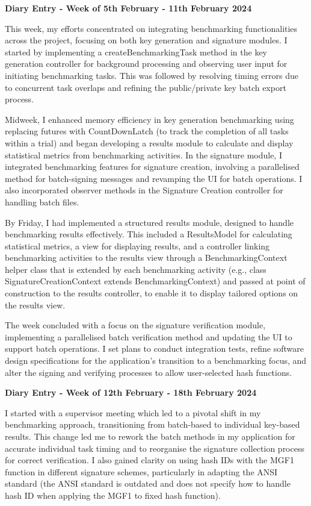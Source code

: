 \documentclass[]{final_report}
\theoremstyle{definition}
\begin{document}
\textbf{Diary Entry - Week of 5th February - 11th February 2024}

This week, my efforts concentrated on integrating benchmarking functionalities across the project,
focusing on both key generation and signature modules. I started by implementing a
createBenchmarkingTask method in the key generation controller for background processing and
observing user input for initiating benchmarking tasks. This was followed by resolving timing errors
due to concurrent task overlaps and refining the public/private key batch export process.

Midweek, I enhanced memory efficiency in key generation benchmarking using replacing futures with
CountDownLatch (to track the completion of all tasks within a trial) and began developing a results
module to calculate and display statistical metrics from benchmarking activities. In the signature
module, I integrated benchmarking features for signature creation, involving a parallelised method
for batch-signing messages and revamping the UI for batch operations. I also incorporated observer
methods in the Signature Creation controller for handling batch files.

By Friday, I had implemented a structured results module, designed to handle benchmarking results
effectively. This included a ResultsModel for calculating statistical metrics, a view for displaying
results, and a controller linking benchmarking activities to the results view through a
BenchmarkingContext helper class that is extended by each benchmarking activity (e.g., class
SignatureCreationContext extends BenchmarkingContext) and passed at point of construction to the
results controller, to enable it to display tailored options on the results view.

The week concluded with a focus on the signature verification module, implementing a parallelised
batch verification method and updating the UI to support batch operations. I set plans to conduct
integration tests, refine software design specifications for the application's transition to a
benchmarking focus, and alter the signing and verifying processes to allow user-selected hash
functions.

\textbf{Diary Entry - Week of 12th February - 18th February 2024}

I started with a supervisor meeting which led to a pivotal shift in my benchmarking approach,
transitioning from batch-based to individual key-based results. This change led me to rework the
batch methods in my application for accurate individual task timing and to reorganise the signature
collection process for correct verification. I also gained clarity on using hash IDs with the MGF1
function in different signature schemes, particularly in adapting the ANSI standard (the ANSI
standard is outdated and does not specify how to handle hash ID when applying the MGF1 to fixed hash
function).
\end{document}

